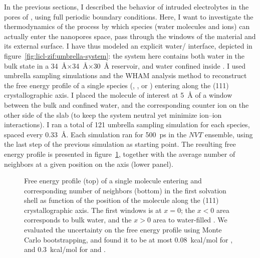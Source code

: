 \documentclass[thesis]{subfiles}
\begin{document}
In the previous sections, I described the behavior of intruded electrolytes in
the pores of , using full periodic boundary conditions. Here, I want to
investigate the thermodynamics of the process by which species (water molecules
and ions) can actually enter the nanopores space, \emph{\ie} pass through the
windows of the material and its external surface. I have thus modeled an
explicit water/ interface, depicted in
figure~\ref{fig:licl-zif:umbrella-system}: the system here contains both water
in the bulk state in a \SI{34}{\AA}$\times$\SI{34}{\AA}$\times$\SI{30}{\AA}
reservoir, and water confined inside . I used umbrella sampling simulations
and the WHAM analysis method\cite{WHAM} to reconstruct the free energy profile
of a single species (, , or ) entering  along the
(111) crystallographic axis. I placed the molecule of interest at \SI{5}{\AA} of
a window between the bulk and confined water, and the corresponding counter ion
on the other side of the  slab (to keep the system neutral yet minimize
ion--ion interactions). I ran a total of 121 umbrella sampling simulation for
each species, spaced every \SI{0.33}{\AA}. Each simulation ran for \SI{500}{ps}
in the $NVT$ ensemble, using the last step of the previous simulation as
starting point. The resulting free energy profile is presented in
figure~\ref{fig:licl-zif:free}, together with the average number of neighbors at
a given position on the axis (lower panel).

\begin{figure}[ht]
    \centering
    
    \caption{Free energy profile (top) of a single molecule entering  and
    corresponding number of neighbors (bottom) in the first solvation shell as
    function of the position of the molecule along the (111) crystallographic
    axis. The first  windows is at $x=0$; the $x<0$ area corresponds to
    bulk water, and the $x>0$ area to water-filled . We evaluated the
    uncertainty on the free energy profile using Monte Carlo
    bootstrapping\cite{WHAM}, and found it to be at most \SI{0.08}{kcal/mol} for
    , and \SI{0.3}{kcal/mol} for  and .}
    \label{fig:licl-zif:free}
\end{figure}
\end{document}
